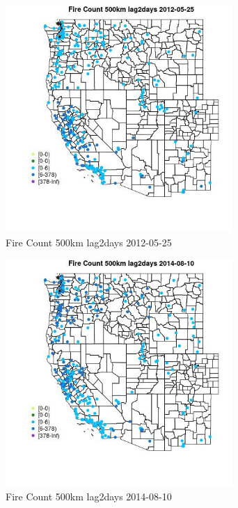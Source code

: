 \begin{figure} 
\centering  
\includegraphics[width=0.77\textwidth]{Code_Outputs/Report_ML_input_PM25_Step4_part_e_de_duplicated_aves_compiled_2019-05-18wNAs_MapObsFire_Count_500km_lag2days2012-05-25.jpg} 
\caption{\label{fig:Report_ML_input_PM25_Step4_part_e_de_duplicated_aves_compiled_2019-05-18wNAsMapObsFire_Count_500km_lag2days2012-05-25}Fire Count 500km lag2days 2012-05-25} 
\end{figure} 
 

\begin{figure} 
\centering  
\includegraphics[width=0.77\textwidth]{Code_Outputs/Report_ML_input_PM25_Step4_part_e_de_duplicated_aves_compiled_2019-05-18wNAs_MapObsFire_Count_500km_lag2days2014-08-10.jpg} 
\caption{\label{fig:Report_ML_input_PM25_Step4_part_e_de_duplicated_aves_compiled_2019-05-18wNAsMapObsFire_Count_500km_lag2days2014-08-10}Fire Count 500km lag2days 2014-08-10} 
\end{figure} 
 

